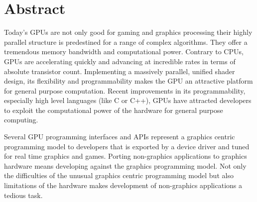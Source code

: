 \section*{Abstract}
\renewcommand{\chapterpagestyle}{empty}
Today's \glspl{GPU} are not only good for gaming and graphics processing their
highly parallel structure is predestined for a range of complex algorithms. They
offer a tremendous memory bandwidth and computational power. Contrary to
\glspl{CPU}, \glspl{GPU} are accelerating quickly and advancing at incredible
rates in terms of absolute transistor count. Implementing a massively parallel,
unified shader design, its flexibility and programmability makes the \gls{GPU}
an attractive platform for general purpose computation. Recent improvements in
its programmability, especially high level languages (like C or C++), %
\glspl{GPU} have attracted developers to exploit the computational power of the
hardware for general purpose computing.

Several \gls{GPU} programming interfaces and \glspl{API} represent a graphics
centric programming model to developers that is exported by a device driver and
tuned for real time graphics and games. Porting non-graphics applications to
graphics hardware means developing against the graphics programming model. Not
only the difficulties of the unusual graphics centric programming model but also
limitations of the hardware makes development of non-graphics applications a
tedious task.

